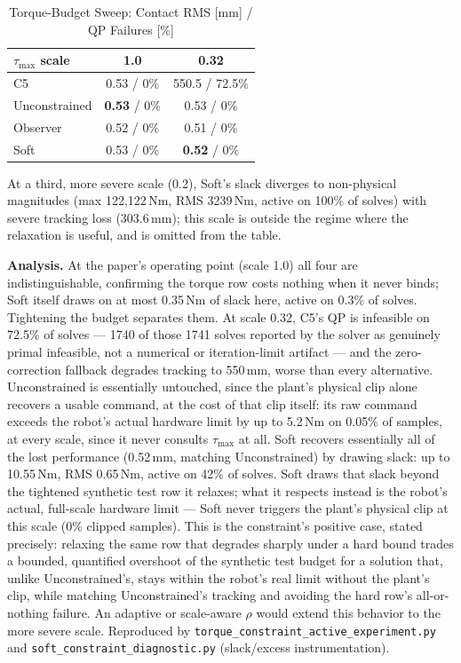 \documentclass[journal]{IEEEtran}
\begin{document}
\begin{table}[!t]
\caption{Torque-Budget Sweep: Contact RMS [mm] / QP Failures [\%]}
\label{tab:tauactive}
\renewcommand{\arraystretch}{1.0}
\footnotesize
\setlength{\tabcolsep}{3pt}
\begin{tabular}{lcc}
\toprule
$\tau_\text{max}$ scale & 1.0 & 0.32\\
\midrule
C5            & 0.53 / 0\%          & 550.5 / 72.5\%\\
Unconstrained & \textbf{0.53} / 0\% & 0.53 / 0\%\\
Observer      & 0.52 / 0\%          & 0.51 / 0\%\\
Soft          & 0.53 / 0\%          & \textbf{0.52} / 0\%\\
\bottomrule
\end{tabular}
\end{table}
At a third, more severe scale (0.2), Soft's slack diverges to
non-physical magnitudes (max 122{,}122\,Nm, RMS 3239\,Nm, active on
100\% of solves) with severe tracking loss (303.6\,mm); this scale is
outside the regime where the relaxation is useful, and is omitted from
the table.

\textbf{Analysis.} At the paper's operating point (scale 1.0) all four are
indistinguishable, confirming the torque row costs nothing when it never
binds; Soft itself draws on at most 0.35\,Nm of slack here, active on
0.3\% of solves. Tightening the budget separates them. At scale 0.32,
C5's QP is infeasible on 72.5\% of solves --- 1740 of those 1741 solves
reported by the solver as genuinely primal infeasible, not a numerical or
iteration-limit artifact --- and the zero-correction fallback degrades
tracking to 550\,mm, worse than every alternative. Unconstrained is
essentially untouched, since the plant's physical clip alone recovers a
usable command, at the cost of that clip itself: its raw command exceeds
the robot's actual hardware limit by up to 5.2\,Nm on 0.05\% of samples,
at every scale, since it never consults $\tau_\text{max}$ at all. Soft
recovers essentially all of the lost performance (0.52\,mm, matching
Unconstrained) by drawing slack: up to 10.55\,Nm,
RMS 0.65\,Nm, active on 42\% of solves. Soft draws that slack beyond the
tightened synthetic test row it relaxes; what it respects instead is the
robot's actual, full-scale hardware limit --- Soft never triggers the
plant's physical clip at this scale (0\% clipped samples). This is the
constraint's positive case, stated precisely: relaxing the same row that
degrades sharply under a hard bound trades a bounded, quantified overshoot
of the synthetic test budget for a solution that, unlike Unconstrained's,
stays within the robot's real limit without the plant's clip, while
matching Unconstrained's tracking and avoiding the hard row's
all-or-nothing failure. An adaptive or scale-aware $\rho$ would extend
this behavior to the more severe scale.
Reproduced by \texttt{torque\_constraint\_active\_experiment.py} and
\texttt{soft\_constraint\_diagnostic.py} (slack/excess instrumentation).
\end{document}
